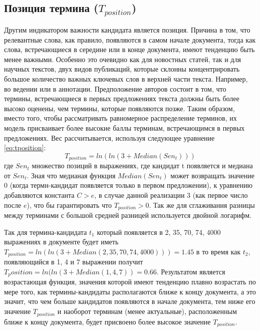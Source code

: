 \subsection{Позиция термина ($T_{position}$)}
Другим индикатором важности кандидата является позиция.
Причина в том, что релевантные слова, как правило, появляются в самом начале документа, тогда как слова, встречающиеся в середине или в конце документа, имеют тенденцию быть менее важными.
Особенно это очевидно как для новостных статей, так и для научных текстов, двух видов публикаций, которые склонны концентрировать большое количество важных ключевых слов в верхней части текста.
Например, во ведении или в аннотации.
Предположение авторов состоит в том, что термины, встречающиеся в первых предложениях текста должны быть более высоко оценены, чем термины, которые появляются позже. 
Таким образом, вместо того, чтобы рассматривать равномерное распределение терминов,
их модель присваивает более высокие баллы терминам, встречающимся в первых предложениях. 
Вес рассчитывается, используя следующее уравнение \eqref{eq:tposition}:
\begin{equation}
	\label{eq:tposition}
	T_{position} = ln(ln(3 + Median(Sen_t)))
\end{equation}
где $Sen_t$ множество позиций в выражениях, где кандидат t появляется и медиана от $Sen_t$.
Зная что медианая функция $Median(Sen_t)$ может возвращать значение 0 (когда термн-кандидат появляется только в первом предложении), к уравнению добавляются константа $C > e$, в случае данной реализации 3 (как первое число после $e$), что бы гарантировать что $T_{position} > 0$.
Так же для сглаживания разницы между терминами с большой средней разницей используется двойной логарифм.

Так для термина-кандидата $t_1$ который появляется в 2, 35, 70, 74, 4000 выражениях в документе будет иметь $T_{position} = ln(ln(3 + Median(2, 35, 70, 74, 4000))) = 1.45$ в то время как $t_2$, появляющийся в 1, 4 и 7 выражении получит $T_position = ln(ln(3 + Median(1, 4, 7)) = 0.66$.
Результатом является возрастающая функция, значения которой имеют тенденцию плавно возрастать по мере того, как термины-кандидаты располагаются ближе к концу документа, а это значит, что чем больше кандидатов появляются в начале документа, тем ниже его значение $T_{position}$ и наоборот терминам (менее актуальные), расположенным ближе к концу документа, будет присвоено более высокое значение $T_{position}$.

